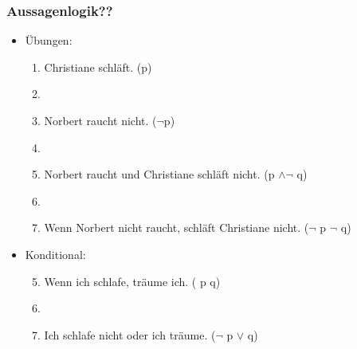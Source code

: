 
\begin{frame}
\frametitle{Aussagenlogik??}

\begin{itemize}
\item Übungen:

\vspace{1em}

\begin{enumerate}
\item Christiane schläft. (p)
\item[]
\item Norbert raucht nicht. ($\lnot$p)
\item[]
\item Norbert raucht und Christiane schläft nicht. (p $\land \lnot$ q)
\item[]
\item Wenn Norbert nicht raucht, schläft Christiane nicht. ($\lnot$ p \ras $\lnot$ q)
\end{enumerate}

\item Konditional:

\begin{enumerate}\setcounter{enumi}{4}
\item Wenn ich schlafe, träume ich. ( p \ras q)
\item[]
\item Ich schlafe nicht oder ich träume. ($\lnot$ p $\lor$ q)
\end{enumerate}

\end{itemize}

\end{frame}



